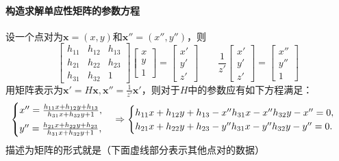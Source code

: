 \documentclass[12pt, a4paper, oneside]{ctexart}
\numberwithin{equation}{section}  %
\theoremstyle{definition}
\def\bd{\boldsymbol}        %
\def\add{\vspace{1ex}}      %
\begin{document}
\paragraph{构造求解单应性矩阵的参数方程}设一个点对为$\bd{x} = (x,y)$和$\bd{x}'' = (x'',y'')$，则
\begin{equation*}
    \left[\begin{matrix}
        h_{11}&h_{12}&h_{13}\\
        h_{21}&h_{22}&h_{23}\\
        h_{31}&h_{32}&1
    \end{matrix}\right]
    \left[\begin{matrix}
        x\\y\\1
    \end{matrix}\right] = 
    \left[\begin{matrix}
        x'\\y'\\z'
    \end{matrix}\right]\qquad
    \frac{1}{z'}\left[\begin{matrix}
        x'\\y'\\z'
    \end{matrix}\right] = \left[\begin{matrix}
        x''\\y''\\1
    \end{matrix}\right]
\end{equation*}
用矩阵表示为$\bd{x}' = H\bd{x},\bd{x}'' =\frac{1}{z'}\bd{x}'$，则对于$H$中的参数应有如下方程满足：
\begin{equation*}
    \begin{cases}
        x'' = \frac{h_{11}x+h_{12}y+h_{13}}{h_{31}x+h_{32}y+1},\add\\
        y'' = \frac{h_{21}x+h_{22}y+h_{23}}{h_{31}x+h_{32}y+1},\\
    \end{cases}\Rightarrow
    \begin{cases}
        h_{11}x+h_{12}y+h_{13} - x''h_{31}x-x''h_{32}y - x'' = 0,\\
        h_{21}x+h_{22}y+h_{23} - y''h_{31}x-y''h_{32}y - y'' = 0.
    \end{cases}
\end{equation*}
描述为矩阵的形式就是（下面虚线部分表示其他点对的数据）
\end{document}
